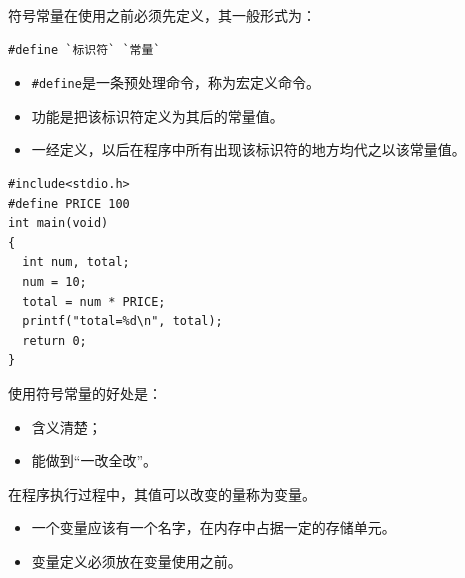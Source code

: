 \begin{frame}[fragile]
符号常量在使用之前必须先定义，其一般形式为：
\begin{lstlisting}
#define `标识符` `常量`
\end{lstlisting}
\vspace{0.05in}

\begin{itemize}
\item \lstinline|#define|是一条预处理命令，称为宏定义命令。\\[0.1in]
\item 功能是把该标识符定义为其后的常量值。\\[0.1in]
\item 一经定义，以后在程序中所有出现该标识符的地方均代之以该常量值。
\end{itemize}
\end{frame}

\begin{frame}[fragile]
\begin{lstlisting}
#include<stdio.h>
#define PRICE 100
int main(void)
{
  int num, total;  
  num = 10;
  total = num * PRICE;
  printf("total=%d\n", total);  
  return 0;
}
\end{lstlisting}

\end{frame}

\begin{frame}[fragile]
使用符号常量的好处是：\vspace{0.05in}

\begin{itemize}
\item 含义清楚；\\[0.1in]
\item 能做到“一改全改”。
\end{itemize}
\end{frame}


\begin{frame}
\begin{dingyi}

在程序执行过程中，其值可以改变的量称为变量。
\end{dingyi}

\begin{itemize}
\item
一个变量应该有一个名字，在内存中占据一定的存储单元。\\[0.1in]
\item
变量定义必须放在变量使用之前。
\end{itemize}
\end{frame}


